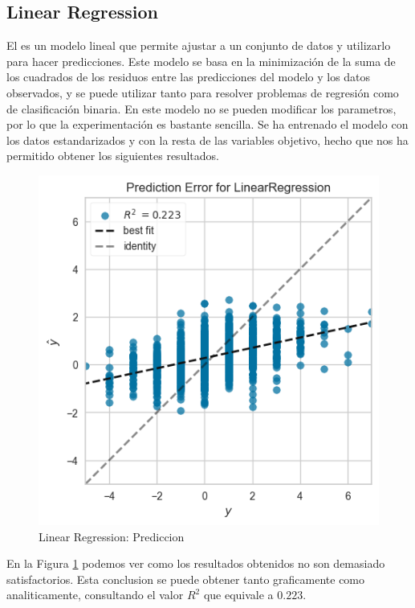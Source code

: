 \subsection{Linear Regression}

El \cite{Sklearn Linear Regression} es un modelo lineal que permite ajustar a un conjunto de datos y utilizarlo para hacer predicciones. Este modelo se basa en la minimización de la suma de los cuadrados de los residuos entre las predicciones del modelo y los datos observados, y se puede utilizar tanto para resolver problemas de regresión como de clasificación binaria. En este modelo no se pueden modificar los parametros, por lo que la experimentación es bastante sencilla. Se ha entrenado el modelo con los datos estandarizados y con la resta de las variables objetivo, hecho que nos ha permitido obtener los siguientes resultados.

\begin{figure}[H]
    \centering
    \includegraphics[width=\smallSize]{images/linearModelLinearRegression.png}
    \caption{Linear Regression: Prediccion}
    \label{Modelos-Lineales-Linear-Regression-Prediccion-Error}
\end{figure}

En la Figura \ref{Modelos-Lineales-Linear-Regression-Prediccion-Error} podemos ver como los resultados obtenidos no son demasiado satisfactorios. Esta conclusion se puede obtener tanto graficamente como analiticamente, consultando el valor $R^2$ que equivale a $0.223$. 
\newline

